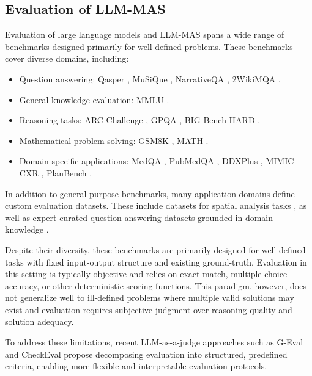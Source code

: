 \subsection{Evaluation of LLM-MAS}

Evaluation of large language models and LLM-MAS spans a wide range of benchmarks designed primarily for well-defined problems. These benchmarks cover diverse domains, including:

\begin{itemize}
    \item Question answering: Qasper \cite{dasigi2021dataset}, MuSiQue \cite{trivedi2022musique}, NarrativeQA \cite{kovcisky2018narrativeqa}, 2WikiMQA \cite{ho2020constructing}.
    \item General knowledge evaluation: MMLU \cite{hendrycks2020measuring}.
    \item Reasoning tasks: ARC-Challenge \cite{clark2018think}, GPQA \cite{rein2023gpqa}, BIG-Bench HARD \cite{suzgun2023challenging}.
    \item Mathematical problem solving: GSM8K \cite{cobbe2021training}, MATH \cite{hendrycks2021measuring}.
    \item Domain-specific applications: MedQA \cite{jin2021disease}, PubMedQA \cite{jin2019pubmedqa}, DDXPlus \cite{fansi2022ddxplus}, MIMIC-CXR \cite{johnson2019mimic}, PlanBench \cite{valmeekam2023planbench}.
\end{itemize}

In addition to general-purpose benchmarks, many application domains define custom evaluation datasets. These include datasets for spatial analysis tasks \cite{lin2025shapefilegpt, luo2026geojson}, as well as expert-curated question answering datasets grounded in domain knowledge \cite{kalyuzhnaya2025llm}.

Despite their diversity, these benchmarks are primarily designed for well-defined tasks with fixed input-output structure and existing ground-truth. 
Evaluation in this setting is typically objective and relies on exact match, multiple-choice accuracy, or other deterministic scoring functions. 
This paradigm, however, does not generalize well to ill-defined problems where multiple valid solutions may exist and evaluation requires subjective judgment over reasoning quality and solution adequacy.

To address these limitations, recent LLM-as-a-judge approaches such as G-Eval \cite{liu2023g} and CheckEval \cite{lee2025checkeval} propose decomposing evaluation into structured, predefined criteria, enabling more flexible and interpretable evaluation protocols. 

